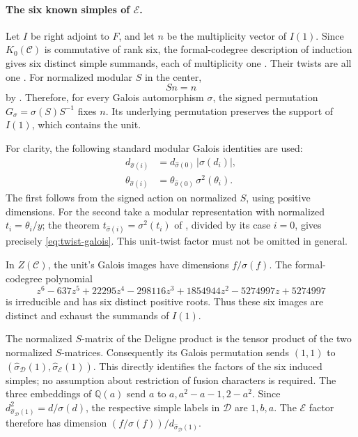 \documentclass[11pt]{article}
\newcommand{\D}{\mathcal D}
\newcommand{\C}{\mathcal C}
\newcommand{\E}{\mathcal E}
\begin{document}
\paragraph{The six known simples of $\E$.}
Let $I$ be right adjoint to $F$, and let $n$ be the multiplicity vector of
$I(1)$. Since $K_0(\C)$ is commutative of rank six, the formal-codegree
description of induction gives six distinct simple summands, each of
multiplicity one \cite[Theorem 2.13]{Ostrik}. Their twists are all one
\cite[Theorem 2.5]{Ostrik}. For normalized modular $S$ in the center,
\[
 Sn=n
\]
by \cite[Proposition 2.8]{Ostrik}. Therefore, for every Galois
automorphism $\sigma$, the signed permutation
$G_\sigma=\sigma(S)S^{-1}$ fixes $n$. Its underlying permutation preserves
the support of $I(1)$, which contains the unit.

For clarity, the following standard modular Galois identities are used:
\begin{align}
 d_{\widehat\sigma(i)}
   &=d_{\widehat\sigma(0)}\,|\sigma(d_i)|,
   \label{eq:dim-galois}\\
 \theta_{\widehat\sigma(i)}
   &=\theta_{\widehat\sigma(0)}\,\sigma^2(\theta_i).
   \label{eq:twist-galois}
\end{align}
The first follows from the signed action on normalized $S$, using positive
dimensions. For the second take a modular representation with normalized
$t_i=\theta_i/y$; the theorem $t_{\widehat\sigma(i)}=\sigma^2(t_i)$
of \cite[Theorem II(iii)]{DLN}, divided by its case $i=0$, gives precisely
\eqref{eq:twist-galois}. This unit-twist factor must not be omitted in
general.

In $Z(\C)$, the unit's Galois images have dimensions $f/\sigma(f)$.
The formal-codegree polynomial
\[
 z^6-637z^5+22295z^4-298116z^3+1854944z^2-5274997z+5274997
\]
is irreducible and has six distinct positive roots. Thus these six images
are distinct and exhaust the summands of $I(1)$.

The normalized $S$-matrix of the Deligne product is the tensor product
of the two normalized $S$-matrices. Consequently its Galois permutation
sends $(1,1)$ to
$(\widehat\sigma_{\D}(1),\widehat\sigma_{\E}(1))$.
This directly identifies the factors of the six induced simples; no
assumption about restriction of fusion characters is required.
The three embeddings of $\mathbb Q(a)$ send $a$ to
$a,a^2-a-1,2-a^2$. Since
$d_{\widehat\sigma_{\D}(1)}^2=d/\sigma(d)$, the respective simple
labels in $\D$ are $1,b,a$.
The $\E$ factor therefore has dimension
$(f/\sigma(f))/d_{\widehat\sigma_{\D}(1)}$.
\end{document}
